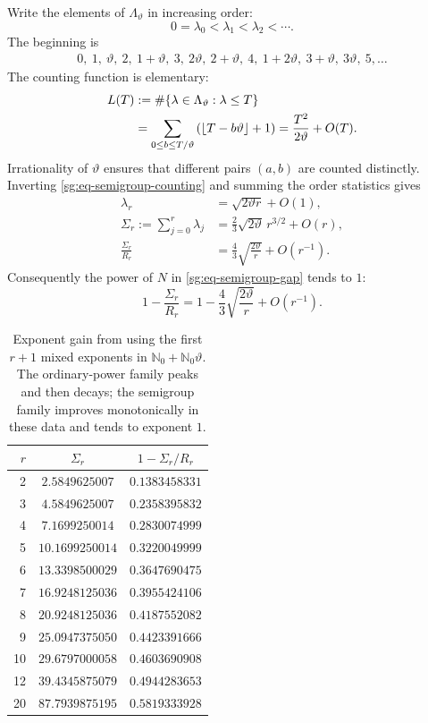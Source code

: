 \documentclass[11pt,oneside]{article}
\theoremstyle{definition}
\theoremstyle{remark}
\newcommand{\Nzero}{\mathbb N_0}
\newcommand{\thetaq}{\vartheta}
\newcommand{\LambdaTheta}{\Lambda_{\thetaq}}
\begin{document}
Write the elements of $\LambdaTheta$ in increasing order:
\[
 0=\lambda_0<\lambda_1<\lambda_2<\cdots.
\]
The beginning is
\begin{align*}
 0,\ 1,\ \thetaq,\ 2,\ 1+\thetaq,\ 3,\ 2\thetaq,\ 2+\thetaq,\ 4,
 \ 1+2\thetaq,\ 3+\thetaq,\ 3\thetaq,\ 5,\ldots
\end{align*}
The counting function is elementary:
\begin{align}
 L(T)
 &:=\#\{\lambda\in\LambdaTheta:\lambda\le T\}\notag\\
 &=\sum_{0\le b\le T/\thetaq}
   \left(\left\lfloor T-b\thetaq\right\rfloor+1\right)
 =\frac{T^2}{2\thetaq}+O(T).
 \label{sg:eq-semigroup-counting}
\end{align}
Irrationality of $\thetaq$ ensures that different pairs $(a,b)$ are counted distinctly.
Inverting \eqref{sg:eq-semigroup-counting} and summing the order statistics gives
\begin{align}
 \lambda_r
 &=\sqrt{2\thetaq r}+O(1),
 \label{sg:eq-lambda-asymp}\\
 \Sigma_r:=\sum_{j=0}^{r}\lambda_j
 &=\frac23\sqrt{2\thetaq}\,r^{3/2}+O(r),
 \label{sg:eq-sigma-asymp}\\
 \frac{\Sigma_r}{R_r}
 &=\frac43\sqrt{\frac{2\thetaq}{r}}+O(r^{-1}).
 \label{sg:eq-sigma-ratio-asymp}
\end{align}
Consequently the power of $N$ in \eqref{sg:eq-semigroup-gap} tends to $1$:
\begin{equation}
 1-\frac{\Sigma_r}{R_r}
 =1-\frac43\sqrt{\frac{2\thetaq}{r}}+O(r^{-1}).
 \label{sg:eq-delta-asymp}
\end{equation}

\begin{table}[ht]
\centering
\small
\begin{tabular}{rcc}
\toprule
$r$ & $\Sigma_r$ & $1-\Sigma_r/R_r$ \\
\midrule
2  & $2.5849625007$  & $0.1383458331$ \\
3  & $4.5849625007$  & $0.2358395832$ \\
4  & $7.1699250014$  & $0.2830074999$ \\
5  & $10.1699250014$ & $0.3220049999$ \\
6  & $13.3398500029$ & $0.3647690475$ \\
7  & $16.9248125036$ & $0.3955424106$ \\
8  & $20.9248125036$ & $0.4187552082$ \\
9  & $25.0947375050$ & $0.4423391666$ \\
10 & $29.6797000058$ & $0.4603690908$ \\
12 & $39.4345875079$ & $0.4944283653$ \\
20 & $87.7939875195$ & $0.5819333928$ \\
\bottomrule
\end{tabular}
\caption{Exponent gain from using the first $r+1$ mixed exponents in
$\Nzero+\Nzero\thetaq$.  The ordinary-power family peaks and then decays; the semigroup
family improves monotonically in these data and tends to exponent $1$.}
\label{sg:tab-semigroup-delta}
\end{table}
\end{document}
